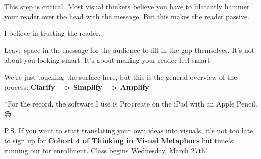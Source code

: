 \vspace{2mm}
\begin{center}
\begin{minipage}{0.92\textwidth}
\small
This step is critical. Most visual thinkers believe you have to blatantly hammer your reader over the head with the message. But this makes the reader passive.

I believe in trusting the reader.

Leave space in the message for the audience to fill in the gap themselves. It’s not about you looking smart. It’s about making your reader feel smart.

We’re just touching the surface here, but this is the general overview of the process: \textbf{Clarify =\textgreater{} Simplify =\textgreater{} Amplify}

*For the record, the software I use is Procreate on the iPad with an Apple Pencil. 😊

P.S. If you want to start translating your own ideas into visuals, it’s not too late to sign up for \textbf{Cohort 4 of Thinking in Visual Metaphors}\textbf{ }but time’s running out for enrollment. Class begins Wednesday, March 27th!
\end{minipage}
\end{center}
\vspace*{\fill}